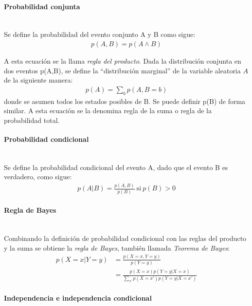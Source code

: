 	\paragraph*{Probabilidad conjunta} ~\\
	
		Se define la probabilidad del evento conjunto A y B como sigue:
		\begin{align}
			p(A,B) = p(A \land B)
		\end{align}

		A esta ecuación se la llama \textit{regla del producto}. Dada la distribución conjunta en dos eventos p(A,B), se define la ``distribución marginal'' de la variable aleatoria $A$ de la siguiente manera:
		\begin{align}
			p(A)=\sum_{b}p(A,B=b)
		\end{align}
		donde se asumen todos los estados posibles de B. Se puede definir p(B) de forma similar. A esta ecuación se la denomina regla de la suma o regla de la probabilidad total.
		
	\paragraph*{Probabilidad condicional} ~\\
	
		Se define la probabilidad condicional del evento A, dado que el evento B es verdadero, como sigue:
		\begin{align}
			p(A|B) = \frac{p(A,B)}{p(B)} ~\text{si}~ p(B)>0
		\end{align}
		
	\paragraph*{Regla de Bayes} ~\\
		
		Combinando la definición de probabilidad condicional con las reglas del producto y la suma se obtiene la \textit{regla de Bayes}, también llamada \textit{Teorema de Bayes}:
		\begin{align}\label{eq:bayes}
			p(X=x|Y=y) &= \frac{p(X=x,Y=y)}{p(Y=y)} \\
			&= \frac{p(X=x)p(Y=y|X=x)}{\sum_{x'}p(X=x')p(Y=y|X=x')}
		\end{align}

	\paragraph*{Independencia e independencia condicional} ~\\
	
